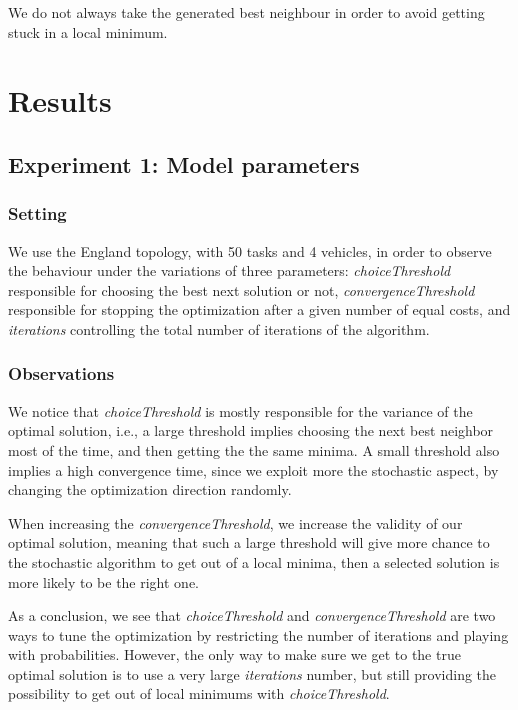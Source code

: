 \documentclass[11pt]{article}
\begin{document}
We do not always take the generated best neighbour in order to avoid getting stuck in a local minimum. 

\section{Results}

\subsection{Experiment 1: Model parameters}

\subsubsection{Setting}
We use the England topology, with 50 tasks and 4 vehicles, in order to observe the behaviour under the variations of three parameters: \textit{choiceThreshold} responsible for choosing the best next solution or not, \textit{convergenceThreshold} responsible for stopping the optimization after a given number of equal costs, and \textit{iterations} controlling the total number of iterations of the algorithm.

\subsubsection{Observations}
We notice that \textit{choiceThreshold} is mostly responsible for the variance of the optimal solution, i.e., a large threshold implies choosing the next best neighbor most of the time, and then getting the the same minima. A small threshold also implies a high convergence time, since we exploit more the stochastic aspect, by changing the optimization direction randomly.

When increasing the \textit{convergenceThreshold}, we increase the validity of our optimal solution, meaning that such a large threshold will give more chance to the stochastic algorithm to get out of a local minima, then a selected solution is more likely to be the right one. 

As a conclusion, we see that \textit{choiceThreshold} and \textit{convergenceThreshold} are two ways to tune the optimization by restricting the number of iterations and playing with probabilities. However, the only way to make sure we get to the true optimal solution is to use a very large \textit{iterations} number, but still providing the possibility to get out of local minimums with \textit{choiceThreshold}.
\end{document}
